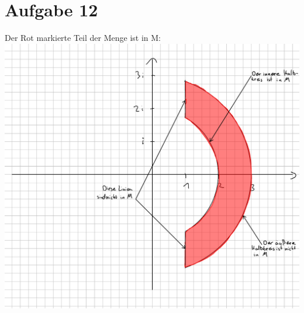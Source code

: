\section{Aufgabe 12}
Der Rot markierte Teil der Menge ist in M: \\
\includegraphics[width=\textwidth]{Aufgaben/12/Skizze_HM_12.pdf}
